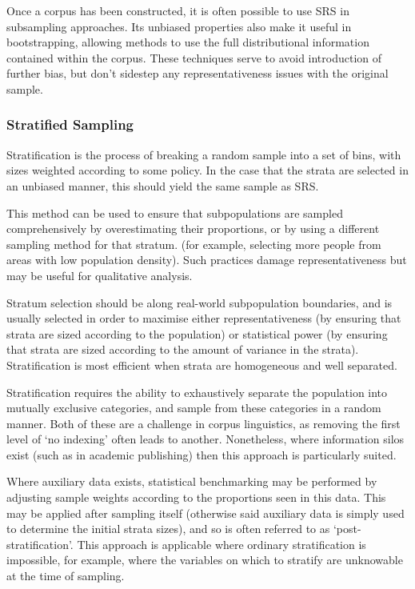Once a corpus has been constructed, it is often possible to use SRS in subsampling approaches.  Its unbiased properties also make it useful in bootstrapping, allowing methods to use the full distributional information contained within the corpus\cite{gries2006exploring}.  These techniques serve to avoid introduction of further bias, but don't sidestep any representativeness issues with the original sample.


\subsubsection{Stratified Sampling}
Stratification is the process of breaking a random sample into a set of bins, with sizes weighted according to some policy.  In the case that the strata are selected in an unbiased manner, this should yield the same sample as SRS.

This method can be used to ensure that subpopulations are sampled comprehensively by overestimating their proportions, or by using a different sampling method for that stratum.  (for example, selecting more people from areas with low population density).  Such practices damage representativeness but may be useful for qualitative analysis\cite{trost1986qualitative}.

Stratum selection should be along real-world subpopulation boundaries, and is usually selected in order to maximise either representativeness (by ensuring that strata are sized according to the population) or statistical power (by ensuring that strata are sized according to the amount of variance in the strata).  Stratification is most efficient when strata are homogeneous and well separated.

Stratification requires the ability to exhaustively separate the population into mutually exclusive categories, and sample from these categories in a random manner.  Both of these are a challenge in corpus linguistics, as removing the first level of `no indexing' often leads to another.  Nonetheless, where information silos exist (such as in academic publishing) then this approach is particularly suited\cite{rossi2013handbook}.

Where auxiliary data exists, statistical benchmarking may be performed by adjusting sample weights according to the proportions seen in this data.  This may be applied after sampling itself (otherwise said auxiliary data is simply used to determine the initial strata sizes), and so is often referred to as `post-stratification'.  This approach is applicable where ordinary stratification is impossible, for example, where the variables on which to stratify are unknowable at the time of sampling.


